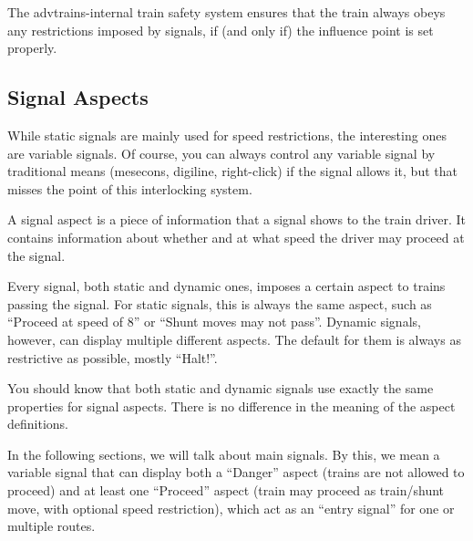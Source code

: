 \documentclass[english]{paper}
\begin{document}
The advtrains-internal train safety system ensures that the train
always obeys any restrictions imposed by signals, if (and only if)
the influence point is set properly.

\subsection{Signal Aspects}

While static signals are mainly used for speed restrictions, the interesting
ones are variable signals. Of course, you can always control any variable
signal by traditional means (mesecons, digiline, right-click) if the
signal allows it, but that misses the point of this interlocking system.

A signal aspect is a piece of information that a signal shows to the
train driver. It contains information about whether and at what speed
the driver may proceed at the signal.

Every signal, both static and dynamic ones, imposes a certain aspect
to trains passing the signal. For static signals, this is always the
same aspect, such as ``Proceed at speed of 8'' or ``Shunt moves
may not pass''. Dynamic signals, however, can display multiple different
aspects. The default for them is always as restrictive as possible,
mostly ``Halt!''.

You should know that both static and dynamic signals use exactly the
same properties for signal aspects. There is no difference in the
meaning of the aspect definitions.

In the following sections, we will talk about main signals. By this,
we mean a variable signal that can display both a ``Danger'' aspect
(trains are not allowed to proceed) and at least one ``Proceed''
aspect (train may proceed as train/shunt move, with optional speed
restriction), which act as an ``entry signal'' for one or multiple
routes.
\end{document}
